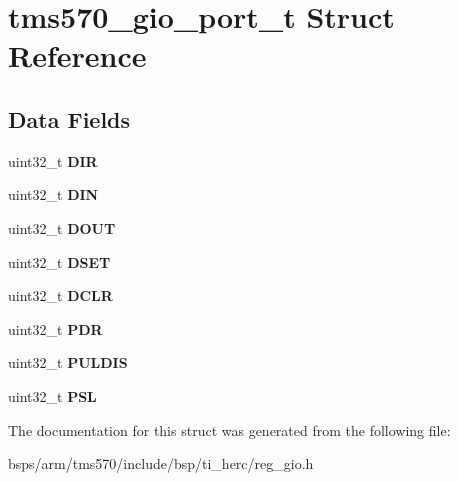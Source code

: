 \hypertarget{structtms570__gio__port__t}{}\section{tms570\+\_\+gio\+\_\+port\+\_\+t Struct Reference}
\label{structtms570__gio__port__t}
\subsection*{Data Fields}
\begin{DoxyCompactItemize}
\item 
\mbox{\label{structtms570__gio__port__t_ad07c0ec82b1c9170d3a3aaf74a2d8827}} 
uint32\+\_\+t {\bfseries D\+IR}
\item 
\mbox{\label{structtms570__gio__port__t_aa5b1a70c85400ba405ebbdb3538dc499}} 
uint32\+\_\+t {\bfseries D\+IN}
\item 
\mbox{\label{structtms570__gio__port__t_a3716d2f0ea9f215778e8039d72059c07}} 
uint32\+\_\+t {\bfseries D\+O\+UT}
\item 
\mbox{\label{structtms570__gio__port__t_a2216b191e96b6d4b25464f0f6320481a}} 
uint32\+\_\+t {\bfseries D\+S\+ET}
\item 
\mbox{\label{structtms570__gio__port__t_a3b0ed02a2ec6ae33a0b2345db4f12d2b}} 
uint32\+\_\+t {\bfseries D\+C\+LR}
\item 
\mbox{\label{structtms570__gio__port__t_ab2302f78cfc409690247d944133f88b0}} 
uint32\+\_\+t {\bfseries P\+DR}
\item 
\mbox{\label{structtms570__gio__port__t_af0cb741555f28fbee8e1ceb56d4ab91f}} 
uint32\+\_\+t {\bfseries P\+U\+L\+D\+IS}
\item 
\mbox{\label{structtms570__gio__port__t_a1b2e1ca3d5258cdfddc691b90eec87c0}} 
uint32\+\_\+t {\bfseries P\+SL}
\end{DoxyCompactItemize}


The documentation for this struct was generated from the following file\+:\begin{DoxyCompactItemize}
\item 
bsps/arm/tms570/include/bsp/ti\+\_\+herc/reg\+\_\+gio.\+h\end{DoxyCompactItemize}
